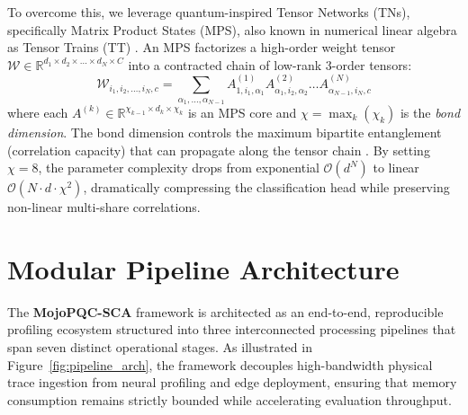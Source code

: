 \documentclass[letterpaper]{article}
\begin{document}
To overcome this, we leverage quantum-inspired Tensor Networks (TNs), specifically Matrix Product States (MPS), also known in numerical linear algebra as Tensor Trains (TT) \cite{novikov2015tensorizing,stoudenmire2016supervised,cichocki2016tensor,oseledets2011tensor,huggins2019towards}. An MPS factorizes a high-order weight tensor $\mathcal{W} \in \mathbb{R}^{d_1 \times d_2 \times \dots \times d_N \times C}$ into a contracted chain of low-rank 3-order tensors:
\begin{equation}
\mathcal{W}_{i_1, i_2, \dots, i_N, c} = \sum_{\alpha_1, \dots, \alpha_{N-1}} A^{(1)}_{1, i_1, \alpha_1} A^{(2)}_{\alpha_1, i_2, \alpha_2} \dots A^{(N)}_{\alpha_{N-1}, i_N, c}
\label{eq:mps_factorization}
\end{equation}
where each $A^{(k)} \in \mathbb{R}^{\chi_{k-1} \times d_k \times \chi_k}$ is an MPS core and $\chi = \max_k(\chi_k)$ is the \textit{bond dimension}. The bond dimension controls the maximum bipartite entanglement (correlation capacity) that can propagate along the tensor chain \cite{glass2020quantum}. By setting $\chi = 8$, the parameter complexity drops from exponential $\mathcal{O}(d^N)$ to linear $\mathcal{O}(N \cdot d \cdot \chi^2)$, dramatically compressing the classification head while preserving non-linear multi-share correlations.

\section{Modular Pipeline Architecture}
\label{sec:pipeline_arch}

The \textbf{MojoPQC-SCA} framework is architected as an end-to-end, reproducible profiling ecosystem structured into three interconnected processing pipelines that span seven distinct operational stages. As illustrated in Figure~\ref{fig:pipeline_arch}, the framework decouples high-bandwidth physical trace ingestion from neural profiling and edge deployment, ensuring that memory consumption remains strictly bounded while accelerating evaluation throughput.
\end{document}
